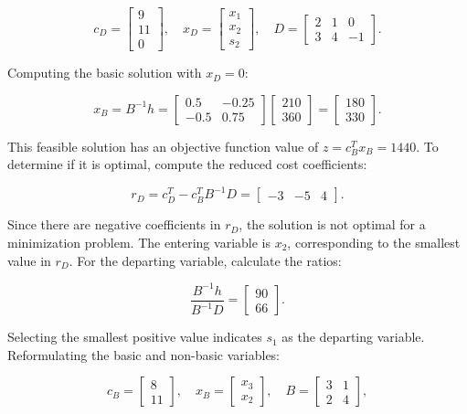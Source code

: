 \documentclass[unicode,11pt,a4paper,oneside,numbers=endperiod,openany]{scrartcl}
\begin{document}
\[
c_D = \begin{bmatrix} 9 \\ 11 \\ 0 \end{bmatrix}, \quad
x_D = \begin{bmatrix} x_1 \\ x_2 \\ s_2 \end{bmatrix}, \quad
D = \begin{bmatrix} 2 & 1 & 0 \\ 3 & 4 & -1 \end{bmatrix}.
\]

Computing the basic solution with \(x_D = 0\):

\[
x_B = B^{-1}h = \begin{bmatrix} 0.5 & -0.25 \\ -0.5 & 0.75 \end{bmatrix} \begin{bmatrix} 210 \\ 360 \end{bmatrix} = \begin{bmatrix} 180 \\ 330 \end{bmatrix}.
\]

This feasible solution has an objective function value of \(z= c^T_Bx_B = 1440\). To determine if it is optimal, compute the reduced cost coefficients:

\[
r_D = c^T_D - c^T_BB^{-1}D = \begin{bmatrix} -3 & -5 & 4 \end{bmatrix}.
\]

Since there are negative coefficients in \(r_D\), the solution is not optimal for a minimization problem. The entering variable is \(x_2\), corresponding to the smallest value in \(r_D\). For the departing variable, calculate the ratios:

\[
\frac{B^{-1}h}{B^{-1}D} = \begin{bmatrix} 90 \\ 66 \end{bmatrix}.
\]

Selecting the smallest positive value indicates \(s_1\) as the departing variable. Reformulating the basic and non-basic variables:

\[
c_B = \begin{bmatrix} 8 \\ 11 \end{bmatrix}, \quad
x_B = \begin{bmatrix} x_3 \\ x_2 \end{bmatrix}, \quad
B = \begin{bmatrix} 3 & 1 \\ 2 & 4 \end{bmatrix},
\]
\end{document}
